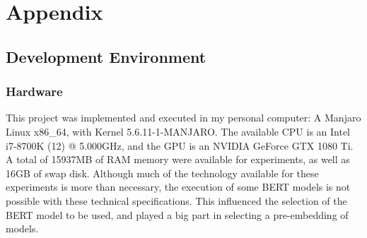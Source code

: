 \chapter{Appendix}\label{chap:Appendix}


\section{Development Environment}\label{sec:Development Environment}

\subsection{Hardware}\label{sub:Hardware}
This project was implemented and executed in my personal computer: A Manjaro Linux x86_64, with Kernel 5.6.11-1-MANJARO. The available CPU is an Intel i7-8700K (12) @ 5.000GHz, and the GPU is an NVIDIA GeForce GTX 1080 Ti. A total of 15937MB of RAM memory were available for experiments, as well as 16GB of swap disk. Although much of the technology available for these experiments is more than necessary, the execution of some BERT models is not possible with these technical specifications. This influenced the selection of the BERT model to be used, and played a big part in selecting a pre-embedding of models.

